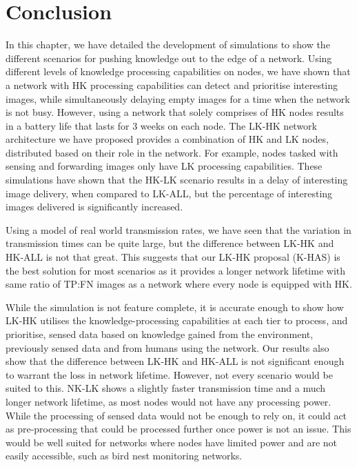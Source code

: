 

\section{Conclusion} \label{sim:conc}
	
In this chapter, we have detailed the development of simulations to show the different scenarios for pushing knowledge out to the edge of a network. Using different levels of knowledge processing capabilities on nodes, we have shown that a network with HK processing capabilities can detect and prioritise interesting images, while simultaneously delaying empty images for a time when the network is not busy. However, using a network that solely comprises of HK nodes results in a battery life that lasts for 3 weeks on each node. The LK-HK network architecture we have proposed provides a combination of HK and LK nodes, distributed based on their role in the network. For example, nodes tasked with sensing and forwarding images only have LK processing capabilities. These simulations have shown that the HK-LK scenario results in a delay of interesting image delivery, when compared to LK-ALL, but the percentage of interesting images delivered is significantly increased.

Using a model of real world transmission rates, we have seen that the variation in transmission times can be quite large, but the difference between LK-HK and HK-ALL is not that great. This suggests that our LK-HK proposal (K-HAS) is the best solution for most scenarios as it provides a longer network lifetime with same ratio of TP:FN images as a network where every node is equipped with HK.

While the simulation is not feature complete, it is accurate enough to show how LK-HK utilises the knowledge-processing capabilities at each tier to process, and prioritise, sensed data based on knowledge gained from the environment, previously sensed data and from humans using the network. Our results also show that the difference between LK-HK and HK-ALL is  not significant enough to warrant the loss in network lifetime. However, not every scenario would be suited to this. NK-LK shows a slightly faster transmission time and a much longer network lifetime, as most nodes would not have any processing power. While the processing of sensed data would not be enough to rely on, it could act as pre-processing that could be processed further once power is not an issue. This would be well suited for networks where nodes have limited power and are not easily accessible, such as bird nest monitoring networks. 

